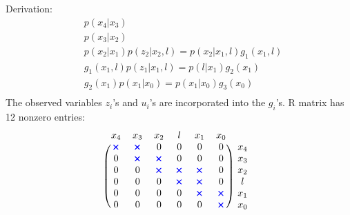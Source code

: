\documentclass[a4paper]{scrreprt}
\newcommand{\bluex}{\color{blue}\pmb{\times}}
\begin{document}
\section{}

\begin{figure}[h]	
\end{figure}
Derivation: 
\begin{align*}
	& p(x_4|x_3) \\
	& p(x_3|x_2) \\
	& p(x_2|x_1)p(z_2|x_2,l) = p(x_2|x_1,l)g_1(x_1,l) \\
	& g_1(x_1,l)p(z_1|x_1,l) = p(l|x_1)g_2(x_1) \\
	& g_2(x_1)p(x_1|x_0) = p(x_1|x_0) g_3(x_0) \\
\end{align*}
The observed variables $z_i$'s and $u_i$'s are incorporated into the $g_i$'s. 
R matrix has 12 nonzero entries: 
\begin{gather}
	\begin{blockarray}{ccccccc}
	x_4 & x_3 & x_2 & l & x_1 & x_0 \\
	\begin{block}{(cccccc)c}
	  \bluex & \bluex & 0 & 0 & 0 & 0 & x_4 \\
	  0 & \bluex & \bluex & 0 & 0 & 0 & x_3 \\
	  0 & 0 & \bluex & \bluex & \bluex & 0 & x_2 \\
	  0 & 0 & 0 & \bluex & \bluex & 0 & l \\
	  0 & 0 & 0 & 0 & \bluex & \bluex & x_1 \\
	  0 & 0 & 0 & 0 & 0 & \bluex & x_0 \\
	\end{block}
	\end{blockarray}
\end{gather}
\end{document}
